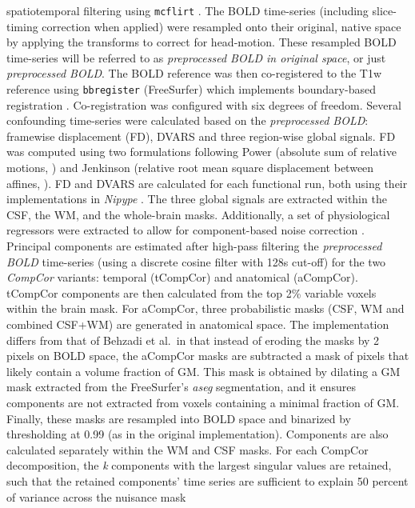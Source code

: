 \documentclass[
]{article}
\begin{document}
\begin{description}
spatiotemporal filtering using \texttt{mcflirt} \citep[FSL
6.0.5.1:57b01774,][]{mcflirt}. The BOLD time-series (including
slice-timing correction when applied) were resampled onto their
original, native space by applying the transforms to correct for
head-motion. These resampled BOLD time-series will be referred to as
\emph{preprocessed BOLD in original space}, or just \emph{preprocessed
BOLD}. The BOLD reference was then co-registered to the T1w reference
using \texttt{bbregister} (FreeSurfer) which implements boundary-based
registration \citep{bbr}. Co-registration was configured with six
degrees of freedom. Several confounding time-series were calculated
based on the \emph{preprocessed BOLD}: framewise displacement (FD),
DVARS and three region-wise global signals. FD was computed using two
formulations following Power (absolute sum of relative motions,
\citet{power_fd_dvars}) and Jenkinson (relative root mean square
displacement between affines, \citet{mcflirt}). FD and DVARS are
calculated for each functional run, both using their implementations in
\emph{Nipype} \citep[following the definitions by][]{power_fd_dvars}.
The three global signals are extracted within the CSF, the WM, and the
whole-brain masks. Additionally, a set of physiological regressors were
extracted to allow for component-based noise correction
\citep[\emph{CompCor},][]{compcor}. Principal components are estimated
after high-pass filtering the \emph{preprocessed BOLD} time-series
(using a discrete cosine filter with 128s cut-off) for the two
\emph{CompCor} variants: temporal (tCompCor) and anatomical (aCompCor).
tCompCor components are then calculated from the top 2\% variable voxels
within the brain mask. For aCompCor, three probabilistic masks (CSF, WM
and combined CSF+WM) are generated in anatomical space. The
implementation differs from that of Behzadi et al.~in that instead of
eroding the masks by 2 pixels on BOLD space, the aCompCor masks are
subtracted a mask of pixels that likely contain a volume fraction of GM.
This mask is obtained by dilating a GM mask extracted from the
FreeSurfer's \emph{aseg} segmentation, and it ensures components are not
extracted from voxels containing a minimal fraction of GM. Finally,
these masks are resampled into BOLD space and binarized by thresholding
at 0.99 (as in the original implementation). Components are also
calculated separately within the WM and CSF masks. For each CompCor
decomposition, the \emph{k} components with the largest singular values
are retained, such that the retained components' time series are
sufficient to explain 50 percent of variance across the nuisance mask

\end{description}
\end{document}
